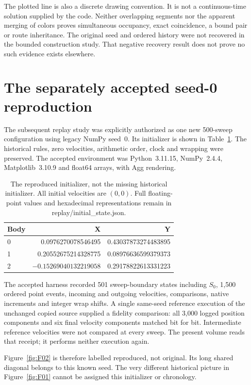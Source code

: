 The plotted line is also a discrete drawing convention. It is not a
continuous-time solution supplied by the code. Neither overlapping
segments nor the apparent merging of colors proves simultaneous
occupancy, exact coincidence, a bound pair or route inheritance.
The original seed and ordered history were not recovered in the bounded
construction study. That negative recovery result does not prove no
such evidence exists elsewhere. 

\section{The separately accepted seed-0 reproduction}
The subsequent replay study was explicitly authorized as one new
500-sweep configuration using legacy NumPy seed~0. Its initializer is
shown in Table~\ref{tab:init01}. The historical rules, zero velocities,
arithmetic order, clock and wrapping were preserved. The accepted
environment was Python~3.11.15, NumPy~2.4.4, Matplotlib~3.10.9 and
float64 arrays, with Agg rendering. \cite{replay01} 

\begin{table}[htbp]\centering\small
\caption{The reproduced initializer, not the missing historical initializer.
All initial velocities are $(0,0)$. Full floating-point values and hexadecimal
representations remain in replay/initial\_state.json.}\label{tab:init01}
\begin{tabular}{@{}lrr@{}}\toprule
Body & X & Y\\\midrule
0 &0.0976270078546495&0.43037873274483895\\
1 &0.20552675214328775&0.08976636599379373\\
2 &$-0.15269040132219058$&0.29178822613331223\\\bottomrule
\end{tabular}
\end{table}

The accepted harness recorded 501 sweep-boundary states including $S_0$,
1,500 ordered point events, incoming and outgoing velocities, comparisons,
native increments and integer wrap shifts. A single same-seed reference
execution of the unchanged copied source supplied a fidelity comparison:
all 3,000 logged position components and six final velocity components
matched bit for bit. Intermediate reference velocities were not compared
at every sweep. The present volume reads that receipt; it performs
neither execution again. 

Figure~\ref{fig:F02} is therefore labelled reproduced, not original.
Its long shared diagonal belongs to this known seed. The very different
historical picture in Figure~\ref{fig:F01} cannot be assigned this
initializer or chronology. 

